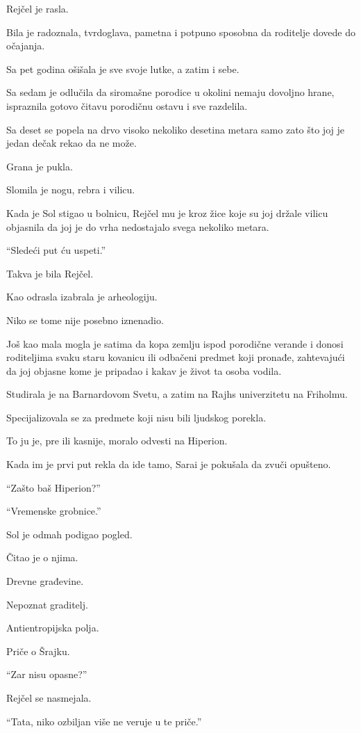 Rejčel je rasla.

Bila je radoznala, tvrdoglava, pametna i potpuno sposobna da roditelje dovede do očajanja.

Sa pet godina ošišala je sve svoje lutke, a zatim i sebe.

Sa sedam je odlučila da siromašne porodice u okolini nemaju dovoljno hrane, ispraznila gotovo čitavu porodičnu ostavu i sve razdelila.

Sa deset se popela na drvo visoko nekoliko desetina metara samo zato što joj je jedan dečak rekao da ne može.

Grana je pukla.

Slomila je nogu, rebra i vilicu.

Kada je Sol stigao u bolnicu, Rejčel mu je kroz žice koje su joj držale vilicu objasnila da joj je do vrha nedostajalo svega nekoliko metara.

``Sledeći put ću uspeti.''

Takva je bila Rejčel.

\bigskip

Kao odrasla izabrala je arheologiju.

Niko se tome nije posebno iznenadio.

Još kao mala mogla je satima da kopa zemlju ispod porodične verande i donosi roditeljima svaku staru kovanicu ili odbačeni predmet koji pronađe, zahtevajući da joj objasne kome je pripadao i kakav je život ta osoba vodila.

Studirala je na Barnardovom Svetu, a zatim na Rajhs univerzitetu na Friholmu.

Specijalizovala se za predmete koji nisu bili ljudskog porekla.

To ju je, pre ili kasnije, moralo odvesti na Hiperion.

Kada im je prvi put rekla da ide tamo, Sarai je pokušala da zvuči opušteno.

``Zašto baš Hiperion?''

``Vremenske grobnice.''

Sol je odmah podigao pogled.

Čitao je o njima.

Drevne građevine.

Nepoznat graditelj.

Antientropijska polja.

Priče o Šrajku.

``Zar nisu opasne?''

Rejčel se nasmejala.

``Tata, niko ozbiljan više ne veruje u te priče.''

